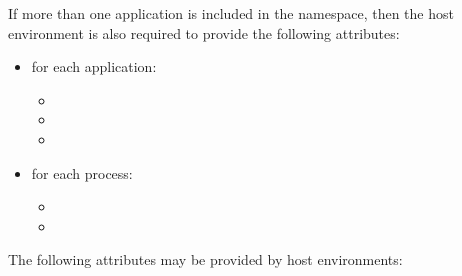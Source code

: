 If more than one application is included in the namespace, then the host environment is also required to provide the following attributes:

\begin{itemize}
    \item for each application:
        \begin{itemize}
            \item {}
            \item {}
            \item {}
        \end{itemize}
    \item for each process:
        \begin{itemize}
            \item {}
            \item {}
        \end{itemize}
\end{itemize}

\reqattrend


\optattrstart

The following attributes may be provided by host environments:

